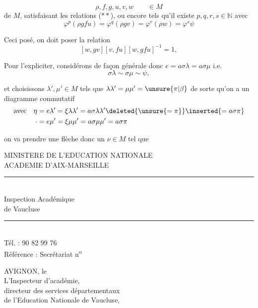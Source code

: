 
\[
\rho,f,g,u,v,w\qquad\in M
\]
de $M$, satisfaisant les relations ($**$), ou encore tels qu'il existe $p,q,r,s\in\mathbb N$ avec
\[
\boxed{\varphi^p(\rho gfu)=\varphi^q(\rho gv)=\varphi^r(\rho w)=\varphi^s\psi}
\]

Ceci posé, on doit poser la relation
\[
\boxed{[w,gv][v,fu][w,gfu]^{-1}=1},
\]

Pour l'expliciter, considérons de façon générale
donc $e=a\sigma\lambda=a\sigma\mu$ i.e.
\[
\boxed{\sigma\lambda\sim\sigma\mu\sim\psi},
\]

et choisissons $\lambda',\mu'\in M$ tels que $\lambda\lambda'=\mu\mu'=\unsure{\pi|\beta}$ de sorte qu'on a un diagramme commutatif
\[
\begin{aligned}\text{avec}\quad\eta&=e\lambda'=\xi\lambda\lambda'=a\sigma\lambda\lambda'\deleted{\unsure{=\pi}}\inserted{=a\sigma\pi}\\ \cdot&=e\mu'=\xi\mu\mu'=a\sigma\mu\mu'=a\sigma\pi\end{aligned}
\]

on va  prendre une flèche  donc un $\nu\in M$ tel que
\par\smallskip
{\footnotesize\noindent\begin{minipage}[t]{.46\linewidth}\raggedright
MINISTERE DE L'EDUCATION NATIONALE\\ ACADEMIE D'AIX-MARSEILLE\\ \rule{2.6em}{.3pt}\\ Inspection Académique\\ de Vaucluse\\ \rule{2.6em}{.3pt}\\ Tél. : 90 82 99 76\\ Référence : Secrétariat n\textsuperscript{o}
\end{minipage}\hfill%
\begin{minipage}[t]{.51\linewidth}\raggedright
AVIGNON, le\\ L'Inspecteur d'académie,\\ directeur des services départementaux\\ de l'Education Nationale de Vaucluse,\\ 
\end{minipage}\par}


